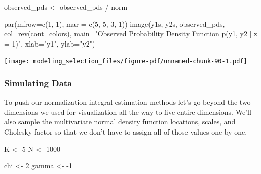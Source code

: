 \documentclass[
  letterpaper,
  DIV=11,
  numbers=noendperiod]{scrartcl}
\newenvironment{Shaded}{\begin{snugshade}}{\end{snugshade}}
\newcommand{\AttributeTok}[1]{\textcolor[rgb]{0.40,0.45,0.13}{#1}}
\newcommand{\DecValTok}[1]{\textcolor[rgb]{0.68,0.00,0.00}{#1}}
\newcommand{\FunctionTok}[1]{\textcolor[rgb]{0.28,0.35,0.67}{#1}}
\newcommand{\NormalTok}[1]{\textcolor[rgb]{0.00,0.23,0.31}{#1}}
\newcommand{\OtherTok}[1]{\textcolor[rgb]{0.00,0.23,0.31}{#1}}
\newcommand{\SpecialCharTok}[1]{\textcolor[rgb]{0.37,0.37,0.37}{#1}}
\newcommand{\StringTok}[1]{\textcolor[rgb]{0.13,0.47,0.30}{#1}}
\begin{document}
\begin{Shaded}
\begin{Highlighting}[]
\NormalTok{observed\_pds }\OtherTok{\textless{}{-}}\NormalTok{ observed\_pds }\SpecialCharTok{/}\NormalTok{ norm}

\FunctionTok{par}\NormalTok{(}\AttributeTok{mfrow=}\FunctionTok{c}\NormalTok{(}\DecValTok{1}\NormalTok{, }\DecValTok{1}\NormalTok{), }\AttributeTok{mar =} \FunctionTok{c}\NormalTok{(}\DecValTok{5}\NormalTok{, }\DecValTok{5}\NormalTok{, }\DecValTok{3}\NormalTok{, }\DecValTok{1}\NormalTok{))}
\FunctionTok{image}\NormalTok{(y1s, y2s, observed\_pds, }\AttributeTok{col=}\FunctionTok{rev}\NormalTok{(cont\_colors),}
      \AttributeTok{main=}\StringTok{"Observed Probability Density Function p(y1, y2 | z = 1)"}\NormalTok{,}
      \AttributeTok{xlab=}\StringTok{"y1"}\NormalTok{, }\AttributeTok{ylab=}\StringTok{"y2"}\NormalTok{)}
\end{Highlighting}
\end{Shaded}

\texttt{[image: modeling\_selection\_files/figure-pdf/unnamed-chunk-90-1.pdf]}

\subsubsection{Simulating Data}\label{simulating-data-2}

To push our normalization integral estimation methods let's go beyond
the two dimensions we used for visualization all the way to five entire
dimensions. We'll also sample the multivariate normal density function
locations, scales, and Cholesky factor so that we don't have to assign
all of those values one by one.

\begin{Shaded}
\begin{Highlighting}[]
\NormalTok{K }\OtherTok{\textless{}{-}} \DecValTok{5}
\NormalTok{N }\OtherTok{\textless{}{-}} \DecValTok{1000}

\NormalTok{chi }\OtherTok{\textless{}{-}} \DecValTok{2}
\NormalTok{gamma }\OtherTok{\textless{}{-}} \SpecialCharTok{{-}}\DecValTok{1}
\end{Highlighting}
\end{Shaded}
\end{document}
